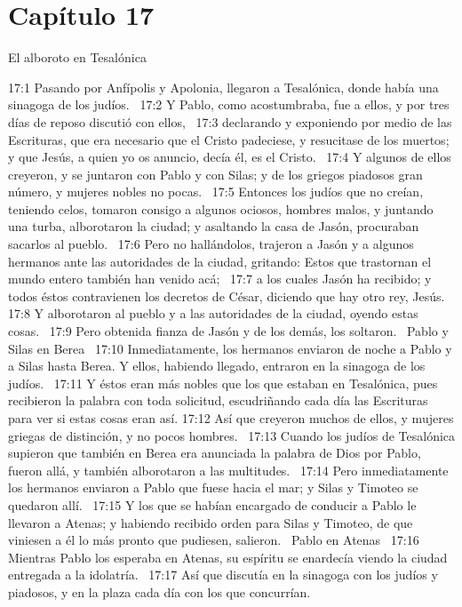 \section*{Capítulo 17}
El alboroto en Tesalónica  

17:1 Pasando por Anfípolis y Apolonia, llegaron a Tesalónica, donde había una sinagoga de los judíos.  
17:2 Y Pablo, como acostumbraba, fue a ellos, y por tres días de reposo discutió con ellos,  
17:3 declarando y exponiendo por medio de las Escrituras, que era necesario que el Cristo padeciese, y resucitase de los muertos; y que Jesús, a quien yo os anuncio, decía él, es el Cristo.  
17:4 Y algunos de ellos creyeron, y se juntaron con Pablo y con Silas; y de los griegos piadosos gran número, y mujeres nobles no pocas.  
17:5 Entonces los judíos que no creían, teniendo celos, tomaron consigo a algunos ociosos, hombres malos, y juntando una turba, alborotaron la ciudad; y asaltando la casa de Jasón, procuraban sacarlos al pueblo.  
17:6 Pero no hallándolos, trajeron a Jasón y a algunos hermanos ante las autoridades de la ciudad, gritando: Estos que trastornan el mundo entero también han venido acá;  
17:7 a los cuales Jasón ha recibido; y todos éstos contravienen los decretos de César, diciendo que hay otro rey, Jesús.  
17:8 Y alborotaron al pueblo y a las autoridades de la ciudad, oyendo estas cosas.  
17:9 Pero obtenida fianza de Jasón y de los demás, los soltaron.  
Pablo y Silas en Berea  
17:10 Inmediatamente, los hermanos enviaron de noche a Pablo y a Silas hasta Berea. Y ellos, habiendo llegado, entraron en la sinagoga de los judíos.  
17:11 Y éstos eran más nobles que los que estaban en Tesalónica, pues recibieron la palabra con toda solicitud, escudriñando cada día las Escrituras para ver si estas cosas eran así. 
17:12 Así que creyeron muchos de ellos, y mujeres griegas de distinción, y no pocos hombres.  
17:13 Cuando los judíos de Tesalónica supieron que también en Berea era anunciada la palabra de Dios por Pablo, fueron allá, y también alborotaron a las multitudes.  
17:14 Pero inmediatamente los hermanos enviaron a Pablo que fuese hacia el mar; y Silas y Timoteo se quedaron allí.  
17:15 Y los que se habían encargado de conducir a Pablo le llevaron a Atenas; y habiendo recibido orden para Silas y Timoteo, de que viniesen a él lo más pronto que pudiesen, salieron.  
Pablo en Atenas  
17:16 Mientras Pablo los esperaba en Atenas, su espíritu se enardecía viendo la ciudad entregada a la idolatría.  
17:17 Así que discutía en la sinagoga con los judíos y piadosos, y en la plaza cada día con los que concurrían.  

